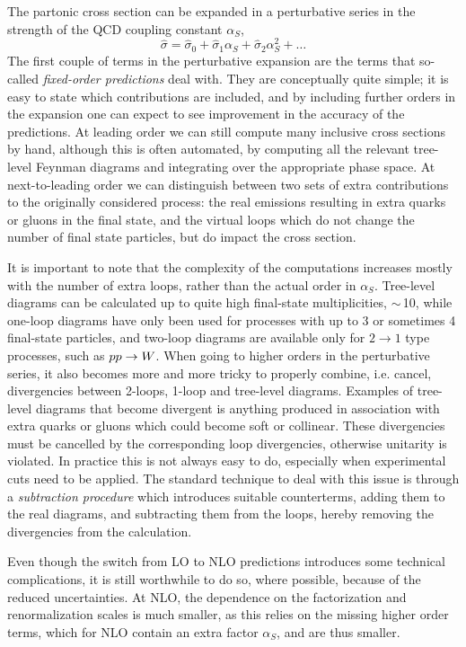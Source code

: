The partonic cross section can be expanded in a perturbative series in the strength of the
QCD coupling constant $\alpha_S$, 
\begin{equation}
  \hat{\sigma} = \hat{\sigma}_0 + \hat{\sigma}_1 \alpha_S + \hat{\sigma}_2 \alpha_S^2 + \ldots
\end{equation}
The first couple of terms in the perturbative expansion are the terms that so-called
\textit{fixed-order predictions} deal with. They are conceptually quite simple; it is easy to state
which contributions are included, and by including further orders in the expansion one can expect to
see improvement in the accuracy of the predictions. 
At leading order we can still compute many inclusive cross sections by hand, although this is often
automated, by computing all the relevant tree-level Feynman diagrams and integrating over the
appropriate phase space. 
At next-to-leading order we can distinguish between two sets of extra contributions to the
originally considered process: the real emissions resulting in extra quarks or gluons in the final
state, and the virtual loops which do not change the number of final state particles, but do impact
the cross section. 

It is important to note that the complexity of the computations increases mostly with the number of
extra loops, rather than the actual order in $\alpha_S$. 
Tree-level diagrams can be calculated up to quite high final-state multiplicities, $\sim\,$10,
while one-loop diagrams have only been used for processes with up to 3 or sometimes 4 final-state
particles, and two-loop diagrams are available only for $2 \rightarrow 1$ type processes, such as
${p}{p} \rightarrow W$.
When going to higher orders in the perturbative series, it also becomes more and more tricky to
properly combine, i.e. cancel, divergencies between 2-loops, 1-loop and tree-level diagrams. 
Examples of tree-level diagrams that become divergent is anything produced in association with
extra quarks or gluons which could become soft or collinear. These divergencies must be cancelled
by the corresponding loop divergencies, otherwise unitarity is violated. 
In practice this is not always easy to do, especially when experimental cuts need to be applied. 
The standard technique to deal with this issue is through a \textit{subtraction procedure} which
introduces suitable counterterms, adding them to the real diagrams, and subtracting them from the
loops, hereby removing the divergencies from the calculation.


Even though the switch from LO to NLO predictions introduces some technical complications, it is
still worthwhile to do so, where possible, because of the reduced uncertainties. 
At NLO, the dependence on the factorization and renormalization scales is much smaller, as this
relies on the missing higher order terms, which for NLO contain an extra factor $\alpha_S$, and are
thus smaller.

